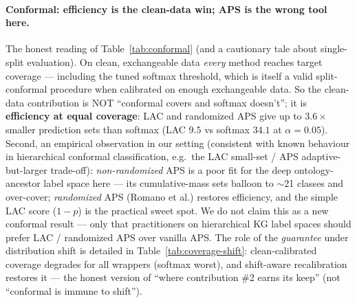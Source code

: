 \paragraph{Conformal: efficiency is the clean-data win; APS is the wrong tool here.}
The honest reading of Table~\ref{tab:conformal} (and a cautionary tale about
single-split evaluation). On clean, exchangeable data \emph{every} method reaches
target coverage --- including the tuned softmax threshold, which is itself a valid
split-conformal procedure when calibrated on enough exchangeable data. So the
clean-data contribution is NOT ``conformal covers and softmax doesn't''; it is
\textbf{efficiency at equal coverage}: LAC and randomized APS give up to
$3.6\times$ smaller prediction sets than softmax (LAC $9.5$ vs softmax $34.1$ at
$\alpha{=}0.05$). Second, an empirical observation in our setting (consistent with
known behaviour in hierarchical conformal classification, e.g.\ the LAC small-set /
APS adaptive-but-larger trade-off): \emph{non-randomized} APS is a poor fit for the
deep ontology-ancestor label space here --- its cumulative-mass sets balloon to
$\sim$21 classes and over-cover; \emph{randomized} APS (Romano et al.) restores
efficiency, and the simple LAC score ($1-p$) is the practical sweet spot. We do not
claim this as a new conformal result --- only that practitioners on hierarchical KG
label spaces should prefer LAC / randomized APS over vanilla APS. The role
of the \emph{guarantee} under distribution shift is detailed in
Table~\ref{tab:coverage-shift}: clean-calibrated coverage degrades for all wrappers
(softmax worst), and shift-aware recalibration restores it --- the honest version
of ``where contribution \#2 earns its keep'' (not ``conformal is immune to shift'').


